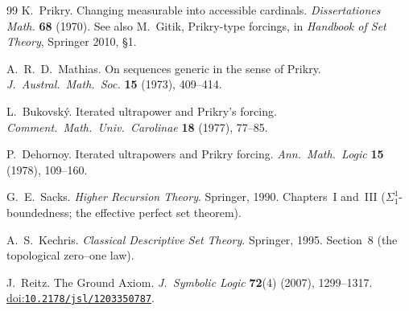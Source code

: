 \documentclass[11pt,letterpaper]{article}
\theoremstyle{definition}
\numberwithin{equation}{section}
\newcommand{\doi}[1]{\href{https://doi.org/#1}{doi:\nolinkurl{#1}}}
\begin{document}
\begin{thebibliography}{99}
K.~Prikry. Changing measurable into accessible cardinals. \emph{Dissertationes Math.} \textbf{68} (1970). See also M.~Gitik, Prikry-type forcings, in \emph{Handbook of Set Theory}, Springer 2010, \S1.

A.~R.~D.~Mathias. On sequences generic in the sense of Prikry. \emph{J.\ Austral.\ Math.\ Soc.} \textbf{15} (1973), 409--414.

L.~Bukovsk\'y. Iterated ultrapower and Prikry's forcing. \emph{Comment.\ Math.\ Univ.\ Carolinae} \textbf{18} (1977), 77--85.

P.~Dehornoy. Iterated ultrapowers and Prikry forcing. \emph{Ann.\ Math.\ Logic} \textbf{15} (1978), 109--160.

G.~E.~Sacks. \emph{Higher Recursion Theory}. Springer, 1990. Chapters~I and~III ($\Sigma^1_1$-boundedness; the effective perfect set theorem).

A.~S.~Kechris. \emph{Classical Descriptive Set Theory}. Springer, 1995. Section~8 (the topological zero--one law).

J.~Reitz. The Ground Axiom. \emph{J.\ Symbolic Logic} \textbf{72}(4) (2007), 1299--1317. \doi{10.2178/jsl/1203350787}.

\end{thebibliography}
\end{document}
